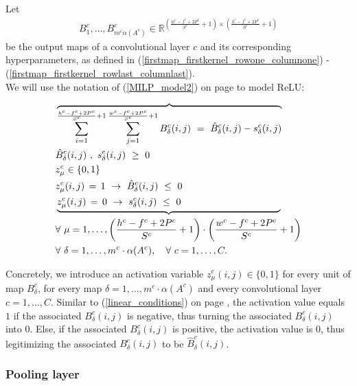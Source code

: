 \documentclass{article}
\begin{document}
Let 
\begin{align}
B_1^c, \ldots, B_{ m^c \alpha(A^c)}^c \in \mathbb{R}^{\left({\frac{w^c - f^c + 2P^c}{S^c}+1}\right) \times \left({\frac{h^c - f^c + 2P^c}{S^c}+1}\right)}
\end{align} be the output maps of a convolutional layer $c$ and its corresponding hyperparameters, as defined in (\ref{firstmap_firstkernel_rowone_columnone}) - (\ref{firstmap_firstkernel_rowlast_columnlast}).\\
We will use the notation of (\ref{MILP_model2}) on page \pageref{MILP_model2} to model ReLU:

\begin{align}
&\overbrace{ 
\sum_{i=1}^{\frac{h^c - f^c + 2P^c}{S^c}+1} \sum_{j=1}^{{\frac{w^c - f^c + 2P^c}{S^c}+1}} B_\delta^c (i,j) \ = \ \hat{B}_\delta^c(i,j) - s^c_\delta(i,j) } \label{CNN_relu_activation} \\
& \hat{B}_\delta^c (i,j) \ , \ s_\delta^c(i,j) \ \geq \ 0 \notag \\
&z_\mu^c \in \{0, 1 \} \notag \\
& z_\mu^c (i,j) \, = \, 1 \ \to \ \hat{B}_\delta^c (i,j) \  \leq \ 0 \notag \\
&\underbrace{ z_\mu^c (i,j) \, = \, 0 \ \to \ s_\delta^c (i,j) \ \leq \ 0 \notag \qquad \qquad \qquad \qquad \qquad \
 } \\
&\forall \ \mu=1, \ldots, \left(\frac{h^c-f^c+2P^c}{S^c}+1\right)\cdot \left(\frac{w^c-f^c+2P^c}{S^c}+1\right) \\
&\forall \ \delta=1, \ldots, m^c \cdot \alpha(A^c), \quad \forall \ c=1, \ldots, C.
\end{align}

Concretely, we introduce an activation variable $z_\mu^c(i,j) \in \{0, 1 \}$ for every unit of map $B_\delta^c$, for every map $\delta =1, \ldots, m^c \cdot \alpha(A^c)$ and every convolutional layer $c=1, \ldots, C$. Similar to (\ref{linear_conditions}) on page \pageref{linear_conditions}, the activation value equals $1$ if the associated $B_\delta^c(i,j)$ is negative, thus turning the associated $B_\delta^c(i,j)$ into $0$. Else, if the associated $B_\delta^c(i,j)$ is positive, the activation value is $0$, thus legitimizing the associated $B_\delta^c(i,j)$ to be $\hat{B}_\delta^c(i,j)$. 






\subsubsection{Pooling layer} 
\end{document}

